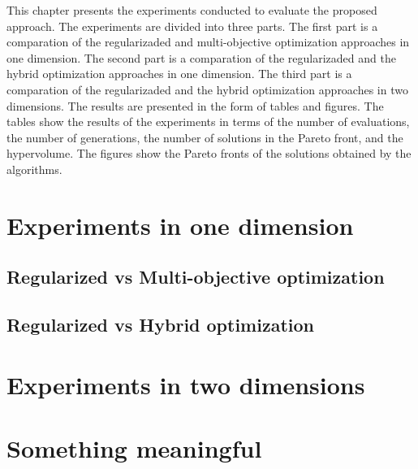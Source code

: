 This chapter presents the experiments conducted to evaluate the proposed approach. The experiments are divided into three parts. The first part is a comparation of the regularizaded and multi-objective optimization approaches in one dimension. The second part is a comparation of the regularizaded and the hybrid optimization approaches in one dimension. The third part is a comparation of the regularizaded and the hybrid optimization approaches in two dimensions. The results are presented in the form of tables and figures. The tables show the results of the experiments in terms of the number of evaluations, the number of generations, the number of solutions in the Pareto front, and the hypervolume. The figures show the Pareto fronts of the solutions obtained by the algorithms. 


\section{Experiments in one dimension}

\subsection{Regularized vs Multi-objective optimization}

%

\subsection{Regularized vs Hybrid optimization}

%

\section{Experiments in two dimensions}

%

\section{Something meaningful}


% 